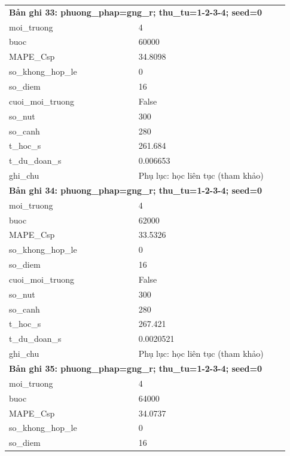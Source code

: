 \begin{longtable}{p{0.43\linewidth}p{0.50\linewidth}}
\midrule
\multicolumn{2}{p{0.95\linewidth}}{\textbf{Bản ghi 33: phuong\_phap=gng\_r; thu\_tu=1-2-3-4; seed=0}} \\
moi\_\allowbreak truong & 4 \\
buoc & 60000 \\
MAPE\_\allowbreak Csp & 34.8098 \\
so\_\allowbreak khong\_\allowbreak hop\_\allowbreak le & 0 \\
so\_\allowbreak diem & 16 \\
cuoi\_\allowbreak moi\_\allowbreak truong & False \\
so\_\allowbreak nut & 300 \\
so\_\allowbreak canh & 280 \\
t\_\allowbreak hoc\_\allowbreak s & 261.684 \\
t\_\allowbreak du\_\allowbreak doan\_\allowbreak s & 0.006653 \\
ghi\_\allowbreak chu & Phụ lục: học liên tục (tham khảo) \\
\midrule
\multicolumn{2}{p{0.95\linewidth}}{\textbf{Bản ghi 34: phuong\_phap=gng\_r; thu\_tu=1-2-3-4; seed=0}} \\
moi\_\allowbreak truong & 4 \\
buoc & 62000 \\
MAPE\_\allowbreak Csp & 33.5326 \\
so\_\allowbreak khong\_\allowbreak hop\_\allowbreak le & 0 \\
so\_\allowbreak diem & 16 \\
cuoi\_\allowbreak moi\_\allowbreak truong & False \\
so\_\allowbreak nut & 300 \\
so\_\allowbreak canh & 280 \\
t\_\allowbreak hoc\_\allowbreak s & 267.421 \\
t\_\allowbreak du\_\allowbreak doan\_\allowbreak s & 0.0020521 \\
ghi\_\allowbreak chu & Phụ lục: học liên tục (tham khảo) \\
\midrule
\multicolumn{2}{p{0.95\linewidth}}{\textbf{Bản ghi 35: phuong\_phap=gng\_r; thu\_tu=1-2-3-4; seed=0}} \\
moi\_\allowbreak truong & 4 \\
buoc & 64000 \\
MAPE\_\allowbreak Csp & 34.0737 \\
so\_\allowbreak khong\_\allowbreak hop\_\allowbreak le & 0 \\
so\_\allowbreak diem & 16 \\

\end{longtable}
